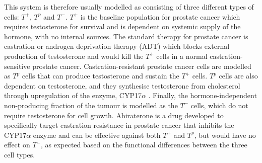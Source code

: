 This system is therefore usually modelled as consisting of three different types of cells: $T^+$, $T^p$ and $T^-$. $T^+$ is the baseline population for prostate cancer which requires testosterone for survival and is dependent on systemic supply of the hormone, with no internal sources. The standard therapy for prostate cancer is castration or androgen deprivation therapy (ADT) which blocks external production of testosterone and would kill the $T^+$ cells in a normal castration-sensitive prostate cancer. Castration-resistant prostate cancer cells are modelled as $T^p$ cells that can produce testosterone and sustain the $T^+$ cells. $T^p$ cells are also dependent on testosterone, and they synthesise testosterone from cholesterol through upregulation of the enzyme, CYP17$\alpha$ \cite{Dillard}. Finally, the hormone-independent non-producing fraction of the tumour is modelled as the $T^-$ cells, which do not require testosterone for cell growth. Abiraterone is a drug developed to specifically target castration resistance in prostate cancer that inhibits the CYP17$\alpha$ enzyme and can be effective against both $T^+$ and $T^p$, but would have no effect on $T^-$, as expected based on the functional differences between the three cell types.

